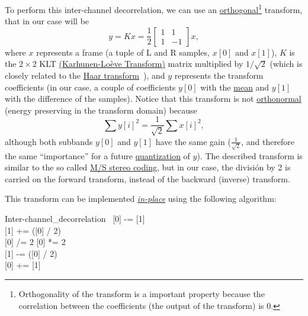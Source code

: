 To perform this inter-channel decorrelation, we can use an
\href{https://en.wikipedia.org/wiki/Orthogonal_transformation}{orthogonal}\footnote{Orthogonality
  of the transform is a important property because the correlation
  between the coefficients (the output of the transform) is 0.}
transform, that in our case will be
\begin{equation}
  y = Kx = \frac{1}{2}\begin{bmatrix} 1 & 1 \\ 1 & -1 \end{bmatrix}x,
\end{equation}
where $x$ represents a frame (a tuple of L and R samples, $x[0]$ and
$x[1]$), $K$ is the $2\times 2$ KLT
\href{http://fourier.eng.hmc.edu/e161/lectures/klt/node3.html}{(Karhunen-Lo\`eve
  Transform)} matrix multiplied by $1/\sqrt{2}$ (which is closely
related to the \href{http://wavelets.pybytes.com/wavelet/haar/}{Haar
  transform}~\cite{vetterli1995wavelets}), and $y$ represents the
transform coefficients (in our case, a couple of coefficients $y[0]$
with the \href{https://en.wikipedia.org/wiki/Arithmetic_mean}{mean}
and $y[1]$ with the difference of the samples). Notice that this
transform is not
\href{https://en.wikipedia.org/wiki/Orthonormal_basis}{orthonormal}
(energy preserving in the transform domain) because
\begin{equation}
  \sum y[i]^2 = \frac{1}{\sqrt{2}}\sum x[i]^2,
\end{equation}
although both subbands $y[0]$ and $y[1]$ have the same gain
($\frac{1}{\sqrt{2}}$, and therefore the same ``importance'' for a
future
\href{https://en.wikipedia.org/wiki/Quantization_(signal_processing)}{quantization}
of $y$). The described transform is similar to the so called
\href{https://en.wikipedia.org/wiki/Joint_encoding#M/S_stereo_coding}{M/S
  stereo coding}, but in our case, the división by 2 is carried on
the forward transform, instead of the backward (inverse) transform.

This transform can be implemented
\href{https://en.wikipedia.org/wiki/In-place_algorithm}{\emph{in-place}}
using the following algorithm:

\begin{pseudocode}{Inter-channel\_decorrelation}{~}
  \BEGIN
    [0] -= [1] \\
    [1] += ([0] / 2) \\
    [0] /= 2
  \END
  \ENDPROCEDURE
  \BEGIN
    [0] *= 2 \\
    [1] -= ([0] / 2) \\
    [0] += [1]
  \END
  \ENDPROCEDURE
\end{pseudocode}

